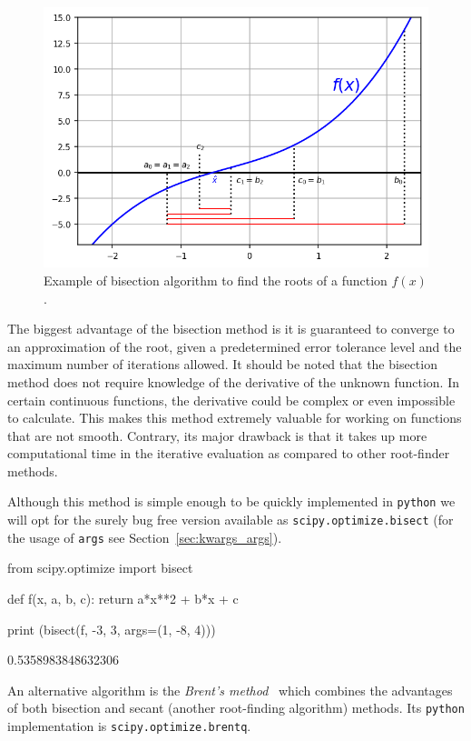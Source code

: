 \begin{figure}[htbp]
\centering
\includegraphics[width=0.7\linewidth]{figures/bisection}
\caption{Example of bisection algorithm to find the roots of a function $f(x)$.}
\label{fig:bisection}
\end{figure}

The biggest advantage of the bisection method is it is guaranteed to converge to an approximation of the root, given a predetermined error tolerance level 
and the maximum number of iterations allowed. It should be noted that the bisection method does not require knowledge of the derivative of the unknown 
function. In certain continuous functions, the derivative could be complex or even impossible to calculate. This makes this method extremely valuable for 
working on functions that are not smooth.
Contrary, its major drawback is that it takes up more computational time in the iterative evaluation as compared to other root-finder methods. 

Although this method is simple enough to be quickly implemented in \texttt{python} we will opt for the surely bug free version available as 
\texttt{scipy.optimize.bisect} (for the usage of \texttt{args} see Section~\ref{sec:kwargs_args}).

\begin{ipythonnon}
from scipy.optimize import bisect 

def f(x, a, b, c):
    return a*x**2 + b*x + c 
  
print (bisect(f, -3, 3, args=(1, -8, 4)))
\end{ipythonnon}
\begin{ioutput}
0.5358983848632306
\end{ioutput}

An alternative algorithm is the \emph{Brent's method}~\cite{bib:brent} which combines the advantages of both bisection and secant 
(another root-finding algorithm) methods. Its \texttt{python} implementation is \texttt{scipy.optimize.brentq}.

